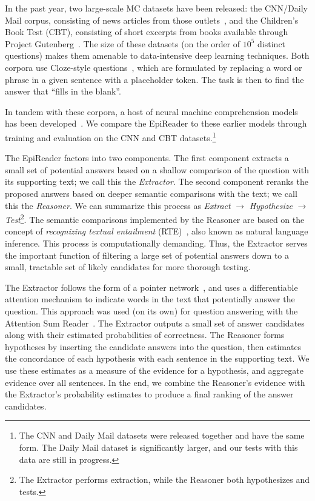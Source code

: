 \documentclass[11pt,letterpaper]{article}
\begin{document}
In the past year, two large-scale MC datasets have been released: the CNN/Daily Mail corpus, consisting of news articles from those outlets~\cite{hermann2015}, and the Children's Book Test (CBT), consisting of short excerpts from books available through Project Gutenberg~\cite{hill2015}. The size of these datasets (on the order of $10^5$ distinct questions) makes them amenable to data-intensive deep learning techniques. Both corpora use Cloze-style questions~\cite{taylor1953}, which are formulated by replacing a word or phrase in a given sentence with a placeholder token. The task is then to find the answer that ``fills in the blank''.

In tandem with these corpora, a host of neural machine comprehension models has been developed~\cite{weston2014,hermann2015,hill2015,kadlec2016,chen2016}. We compare the EpiReader to these earlier models through training and evaluation on the CNN and CBT datasets.\footnote{The CNN and Daily Mail datasets were released together and have the same form. The Daily Mail dataset is significantly larger, and our tests with this data are still in progress.}

The EpiReader factors into two components. The first component extracts a small set of potential answers based on a shallow comparison of the question with its supporting text; we call this the \emph{Extractor}. The second component reranks the proposed answers based on deeper semantic comparisons with the text; we call this the \emph{Reasoner}.
We can summarize this process as \textsl{Extract} $\rightarrow$ \textsl{Hypothesize} $\rightarrow$ \textsl{Test}\footnote{The Extractor performs extraction, while the Reasoner both hypothesizes and tests.}.
The semantic comparisons implemented by the Reasoner are based on the concept of {\it recognizing textual entailment} (RTE)~\cite{dagan2006}, also known as natural language inference. This process is computationally demanding. Thus, the Extractor serves the important function of filtering a large set of potential answers down to a small, tractable set of likely candidates for more thorough testing.

The Extractor follows the form of a pointer network~\cite{vinyals2015}, and uses a differentiable attention mechanism to indicate words in the text that potentially answer the question. This approach was used (on its own) for question answering with the Attention Sum Reader~\cite{kadlec2016}. The Extractor outputs a small set of answer candidates along with their estimated probabilities of correctness. The Reasoner forms hypotheses by inserting the candidate answers into the question, then estimates the concordance of each hypothesis with each sentence in the supporting text. We use these estimates as a measure of the evidence for a hypothesis, and aggregate evidence over all sentences. In the end, we combine the Reasoner's evidence with the Extractor's probability estimates to produce a final ranking of the answer candidates.
\end{document}
